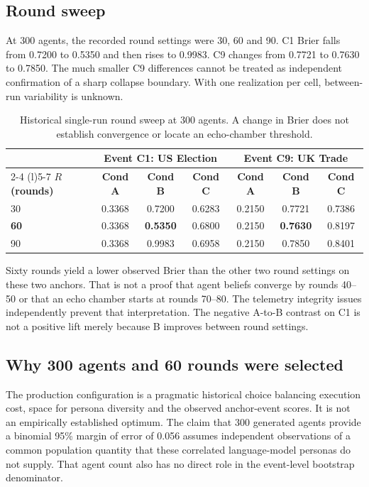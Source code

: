 \subsection{Round sweep}
\label{sec:r_scaling}
At 300 agents, the recorded round settings were 30, 60 and 90. C1 Brier falls from 0.7200 to 0.5350 and then rises to 0.9983. C9 changes from 0.7721 to 0.7630 to 0.7850. The much smaller C9 differences cannot be treated as independent confirmation of a sharp collapse boundary. With one realization per cell, between-run variability is unknown.
\begin{table}[!htbp]
\centering
\caption{Historical single-run round sweep at 300 agents. A change in Brier does not establish convergence or locate an echo-chamber threshold.}
\label{tab:r_sweep_results}
\begin{tabular}{lcccccc}
\toprule
 & \multicolumn{3}{c}{\textbf{Event C1: US Election}} & \multicolumn{3}{c}{\textbf{Event C9: UK Trade}} \\
\cmidrule(r){2-4} \cmidrule(l){5-7}
\textbf{$R$ (rounds)} & \textbf{Cond A} & \textbf{Cond B} & \textbf{Cond C} & \textbf{Cond A} & \textbf{Cond B} & \textbf{Cond C} \\
\midrule
30  & 0.3368 & 0.7200 & 0.6283 & 0.2150 & 0.7721 & 0.7386 \\
\textbf{60}  & 0.3368 & \textbf{0.5350} & 0.6800 & 0.2150 & \textbf{0.7630} & 0.8197 \\
90  & 0.3368 & 0.9983 & 0.6958 & 0.2150 & 0.7850 & 0.8401 \\
\bottomrule
\end{tabular}
\setlength{\tabcolsep}{6pt}
\end{table}
Sixty rounds yield a lower observed Brier than the other two round settings on these two anchors. That is not a proof that agent beliefs converge by rounds 40--50 or that an echo chamber starts at rounds 70--80. The telemetry integrity issues independently prevent that interpretation. The negative A-to-B contrast on C1 is not a positive lift merely because B improves between round settings.

\subsection{Why 300 agents and 60 rounds were selected}
\label{sec:optimal_bounds}
\label{sec:optimal_config}
The production configuration is a pragmatic historical choice balancing execution cost, space for persona diversity and the observed anchor-event scores. It is not an empirically established optimum. The claim that 300 generated agents provide a binomial 95\% margin of error of 0.056 assumes independent observations of a common population quantity that these correlated language-model personas do not supply. That agent count also has no direct role in the event-level bootstrap denominator.

